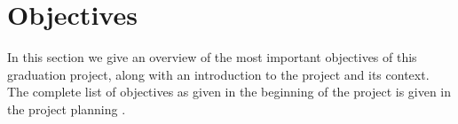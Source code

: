 
\section{Objectives}
\label{sec:objectives}
In this section we give an overview of the most important objectives of this graduation project, along with an introduction to the project and its context.
The complete list of objectives as given in the beginning of the project is given in the project planning .




